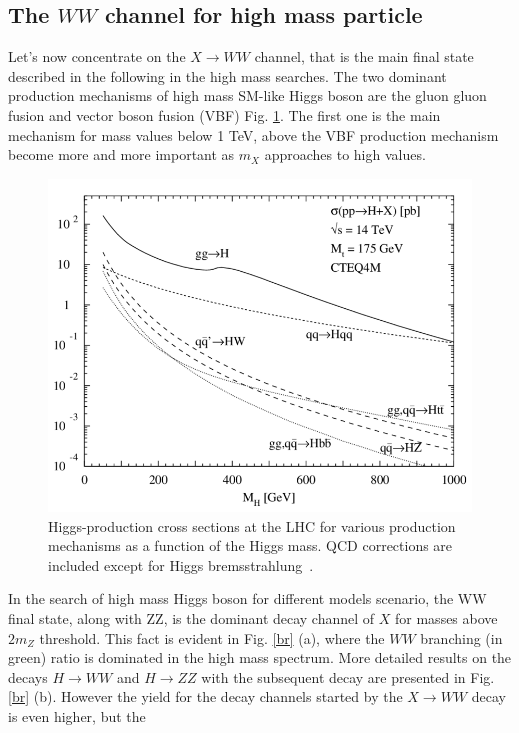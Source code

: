 \subsection*{The $WW$ channel for high mass particle}
Let’s now concentrate on the $X \to WW$ channel, that is the main final state described in the following in the high mass searches.
The two dominant production mechanisms of high mass SM-like Higgs boson are the
gluon gluon fusion and vector boson fusion (VBF) Fig. \ref{prod}. 
The first one is the main mechanism for mass values below 1 TeV, above the VBF production mechanism become more and more important as $m_X$ approaches to high values.
\begin{figure}
\centering
\includegraphics[scale= 0.4]{../Cap1/Higgs-production-cross-sections-at-the-LHC-for-various-production-mechanisms-as-a}
\caption{Higgs-production cross sections at the LHC for various production mechanisms as a function of the Higgs mass. QCD corrections are included except for Higgs bremsstrahlung~\cite{Djouadi2004}.}
\label{prod}
\end{figure}
In the search of high mass Higgs boson for different models scenario, the WW final state, along with ZZ, is the dominant decay channel of $X$ for masses above $2m_Z$ threshold. This fact is evident in Fig. \ref{br} (a), where the $WW$ branching (in green) ratio is dominated in the high mass spectrum. More detailed results on the decays $H \to WW$ and $H \to ZZ $ with the subsequent decay are presented in Fig. \ref{br} (b).
However the yield for the decay channels started by the $X \to WW$ decay is even higher, but the
